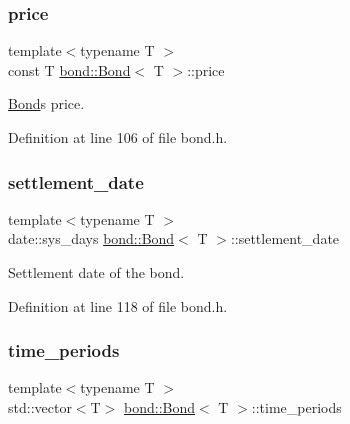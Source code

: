 \subsubsection{\texorpdfstring{price}{price}}
{\footnotesize\ttfamily template$<$typename T $>$ \\
const T \hyperlink{classbond_1_1_bond}{bond\+::\+Bond}$<$ T $>$\+::price\hspace{0.3cm}{\ttfamily [private]}}



\hyperlink{classbond_1_1_bond}{Bond}\textquotesingle{}s price. 



Definition at line 106 of file bond.\+h.

\mbox{\label{classbond_1_1_bond_a2ead15c4c0cbda2cdecf6500b02442e7}} 
\subsubsection{\texorpdfstring{settlement\+\_\+date}{settlement\_date}}
{\footnotesize\ttfamily template$<$typename T $>$ \\
date\+::sys\+\_\+days \hyperlink{classbond_1_1_bond}{bond\+::\+Bond}$<$ T $>$\+::settlement\+\_\+date\hspace{0.3cm}{\ttfamily [private]}}



Settlement date of the bond. 



Definition at line 118 of file bond.\+h.

\mbox{\label{classbond_1_1_bond_ac3db034ebeff1f6cd2ed7061fda27fad}} 
\subsubsection{\texorpdfstring{time\+\_\+periods}{time\_periods}}
{\footnotesize\ttfamily template$<$typename T $>$ \\
std\+::vector$<$T$>$ \hyperlink{classbond_1_1_bond}{bond\+::\+Bond}$<$ T $>$\+::time\+\_\+periods\hspace{0.3cm}{\ttfamily [private]}}



